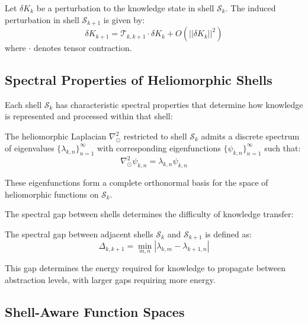 \begin{theorem}
Let $\delta K_k$ be a perturbation to the knowledge state in shell $\mathcal{S}_k$. The induced perturbation in shell $\mathcal{S}_{k+1}$ is given by:
\begin{equation}
\delta K_{k+1} = \mathcal{T}_{k,k+1} \cdot \delta K_k + O(||\delta K_k||^2)
\end{equation}
where $\cdot$ denotes tensor contraction.
\end{theorem}

\subsection{Spectral Properties of Heliomorphic Shells}

Each shell $\mathcal{S}_k$ has characteristic spectral properties that determine how knowledge is represented and processed within that shell:

\begin{theorem}
The heliomorphic Laplacian $\nabla_{\odot}^2$ restricted to shell $\mathcal{S}_k$ admits a discrete spectrum of eigenvalues $\{\lambda_{k,n}\}_{n=1}^{\infty}$ with corresponding eigenfunctions $\{\psi_{k,n}\}_{n=1}^{\infty}$ such that:
\begin{equation}
\nabla_{\odot}^2 \psi_{k,n} = \lambda_{k,n} \psi_{k,n}
\end{equation}

These eigenfunctions form a complete orthonormal basis for the space of heliomorphic functions on $\mathcal{S}_k$.
\end{theorem}

The spectral gap between shells determines the difficulty of knowledge transfer:

\begin{proposition}
The spectral gap between adjacent shells $\mathcal{S}_k$ and $\mathcal{S}_{k+1}$ is defined as:
\begin{equation}
\Delta_{k,k+1} = \min_{m,n} |\lambda_{k,m} - \lambda_{k+1,n}|
\end{equation}

This gap determines the energy required for knowledge to propagate between abstraction levels, with larger gaps requiring more energy.
\end{proposition}

\subsection{Shell-Aware Function Spaces}

